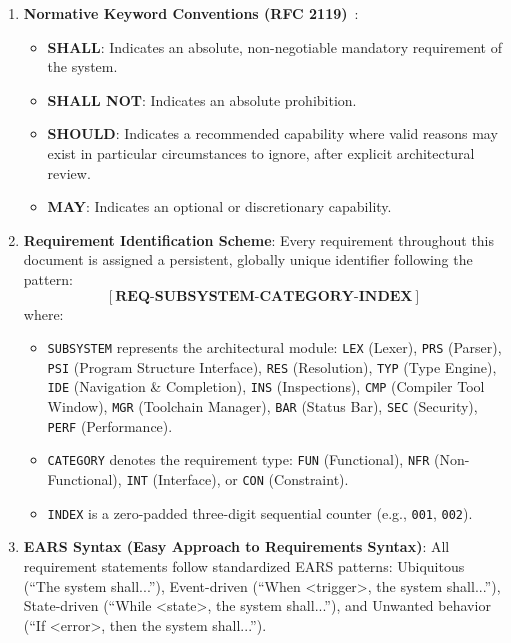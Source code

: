 \begin{enumerate}
    \item \textbf{Normative Keyword Conventions (RFC 2119)}~\cite{rfc2119}:
    \begin{itemize}
        \item \textbf{SHALL}: Indicates an absolute, non-negotiable mandatory requirement of the system.
        \item \textbf{SHALL NOT}: Indicates an absolute prohibition.
        \item \textbf{SHOULD}: Indicates a recommended capability where valid reasons may exist in particular circumstances to ignore, after explicit architectural review.
        \item \textbf{MAY}: Indicates an optional or discretionary capability.
    \end{itemize}
    
    \item \textbf{Requirement Identification Scheme}:
    Every requirement throughout this document is assigned a persistent, globally unique identifier following the pattern:
    \begin{equation*}
        \mathbf{[REQ\text{-}SUBSYSTEM\text{-}CATEGORY\text{-}INDEX]}
    \end{equation*}
    where:
    \begin{itemize}
        \item \texttt{SUBSYSTEM} represents the architectural module: \texttt{LEX} (Lexer), \texttt{PRS} (Parser), \texttt{PSI} (Program Structure Interface), \texttt{RES} (Resolution), \texttt{TYP} (Type Engine), \texttt{IDE} (Navigation \& Completion), \texttt{INS} (Inspections), \texttt{CMP} (Compiler Tool Window), \texttt{MGR} (Toolchain Manager), \texttt{BAR} (Status Bar), \texttt{SEC} (Security), \texttt{PERF} (Performance).
        \item \texttt{CATEGORY} denotes the requirement type: \texttt{FUN} (Functional), \texttt{NFR} (Non-Functional), \texttt{INT} (Interface), or \texttt{CON} (Constraint).
        \item \texttt{INDEX} is a zero-padded three-digit sequential counter (e.g., \texttt{001}, \texttt{002}).
    \end{itemize}
    
    \item \textbf{EARS Syntax (Easy Approach to Requirements Syntax)}:
    All requirement statements follow standardized EARS patterns: Ubiquitous (``The system shall...''), Event-driven (``When <trigger>, the system shall...''), State-driven (``While <state>, the system shall...''), and Unwanted behavior (``If <error>, then the system shall...'').
\end{enumerate}

